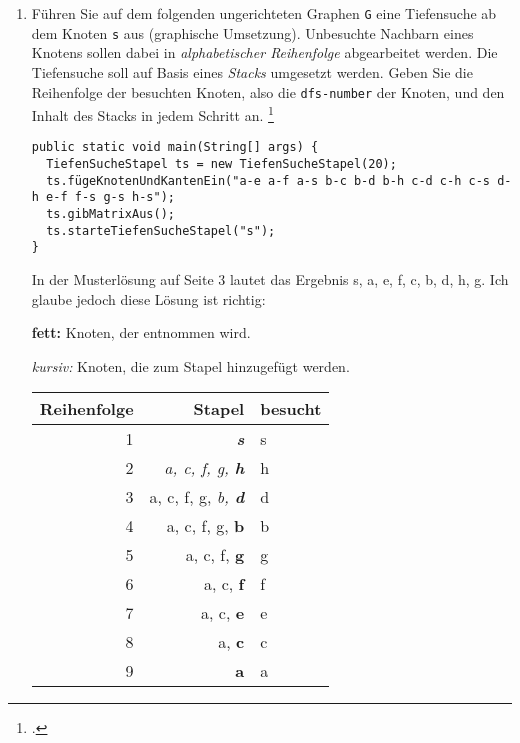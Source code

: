 \documentclass{lehramt-informatik-aufgabe}
\begin{document}
\begin{enumerate}


\item Führen Sie auf dem folgenden ungerichteten Graphen \texttt{G} eine
Tiefensuche ab dem Knoten \texttt{s} aus (graphische Umsetzung).
Unbesuchte Nachbarn eines Knotens sollen dabei in \emph{alphabetischer
Reihenfolge} abgearbeitet werden. Die Tiefensuche soll auf Basis eines
\emph{Stacks} umgesetzt werden. Geben Sie die
Reihenfolge der besuchten Knoten, also die \texttt{dfs-number} der
Knoten, und den Inhalt des Stacks in jedem Schritt an.
\footcite[Seite 2: Tiefensuche, Breitensuche, Aufgabe 3]{aud:ab:6}

\begin{verbatim}
public static void main(String[] args) {
  TiefenSucheStapel ts = new TiefenSucheStapel(20);
  ts.fügeKnotenUndKantenEin("a-e a-f a-s b-c b-d b-h c-d c-h c-s d-h e-f f-s g-s h-s");
  ts.gibMatrixAus();
  ts.starteTiefenSucheStapel("s");
}
\end{verbatim}

\begin{liAntwort}
In der Musterlösung auf Seite 3 lautet das Ergebnis s, a, e, f, c, b, d, h, g.
Ich glaube jedoch diese Lösung ist richtig:

\textbf{fett:} Knoten, der entnommen wird.

\textit{kursiv:} Knoten, die zum Stapel hinzugefügt werden.

\begin{tabular}{|r|r|l|}
\hline
\textbf{Reihenfolge} & \textbf{Stapel} & \textbf{besucht} \\\hline\hline
1 & \textit{\textbf{s}} & s \\\hline
2 & \textit{a, c, f, g, \textbf{h}} & h \\\hline
3 & a, c, f, g, \textit{b, \textbf{d}} & d \\\hline
4 & a, c, f, g, \textbf{b} & b \\\hline
5 & a, c, f, \textbf{g} & g \\\hline
6 & a, c, \textbf{f} & f \\\hline
7 & a, c, \textbf{e} & e \\\hline
8 & a, \textbf{c} & c \\\hline
9 & \textbf{a} & a \\\hline
\end{tabular}
\end{liAntwort}


\end{enumerate}
\end{document}
